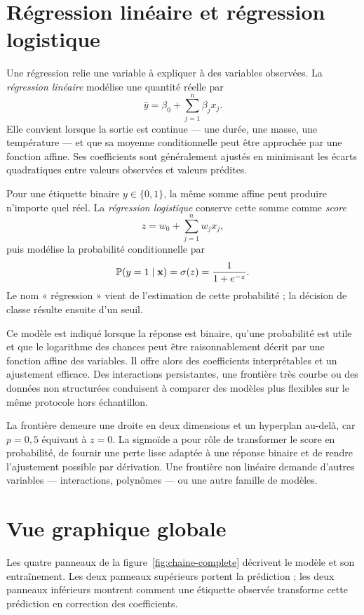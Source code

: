 \section{Régression linéaire et régression logistique}

Une régression relie une variable à expliquer à des variables observées. La
\emph{régression linéaire} modélise une quantité réelle par
\[
  \widehat y=\beta_0+\sum_{j=1}^{n}\beta_jx_j .
\]
Elle convient lorsque la sortie est continue --- une durée, une masse, une
température --- et que sa moyenne conditionnelle peut être approchée par une
fonction affine. Ses coefficients sont généralement ajustés en minimisant les
écarts quadratiques entre valeurs observées et valeurs prédites.

Pour une étiquette binaire $y\in\{0,1\}$, la même somme affine peut produire
n'importe quel réel. La \emph{régression logistique} conserve cette somme comme
\emph{score}
\[
  z=w_0+\sum_{j=1}^{n}w_jx_j,
\]
puis modélise la probabilité conditionnelle par
\[
  \mathbb{P}(y=1\mid\mathbf{x})=\sigma(z)=\frac{1}{1+e^{-z}}.
\]
Le nom « régression » vient de l'estimation de cette probabilité ; la décision
de classe résulte ensuite d'un seuil.

Ce modèle est indiqué lorsque la réponse est binaire, qu'une probabilité est
utile et que le logarithme des chances peut être raisonnablement décrit par une
fonction affine des variables. Il offre alors des coefficients interprétables
et un ajustement efficace. Des interactions persistantes, une frontière très
courbe ou des données non structurées conduisent à comparer des modèles plus
flexibles sur le même protocole hors échantillon.

\begin{resultat}
La frontière demeure une droite en deux dimensions et un hyperplan au-delà,
car $p=0{,}5$ équivaut à $z=0$. La sigmoïde
a pour rôle de transformer le score en probabilité, de fournir une perte lisse
adaptée à une réponse binaire et de rendre l'ajustement possible par dérivation.
Une frontière non linéaire demande d'autres variables --- interactions,
polynômes --- ou une autre famille de modèles.
\end{resultat}

\section{Vue graphique globale}

Les quatre panneaux de la figure~\ref{fig:chaine-complete} décrivent le modèle
et son entraînement. Les deux panneaux supérieurs portent la prédiction ; les
deux panneaux inférieurs montrent comment une étiquette observée transforme
cette prédiction en correction des coefficients.

